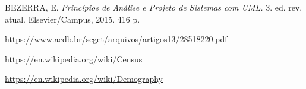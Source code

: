 \documentclass[a4paper,12pt]{article}
\begin{document}
\newpage
\begin{thebibliography}{9}
	BEZERRA, E.
	\textit{Princípios de Análise e Projeto de Sistemas com UML.}
	 3. ed. rev. atual.
	 Elsevier/Campus,
	 2015.
	 416 p.\\
	\par\url{https://www.aedb.br/seget/arquivos/artigos13/28518220.pdf}\\
	\par\url{https://en.wikipedia.org/wiki/Census}\\
	\par\url{https://en.wikipedia.org/wiki/Demography}\\
\end{thebibliography}
\markright{}
\end{document}
